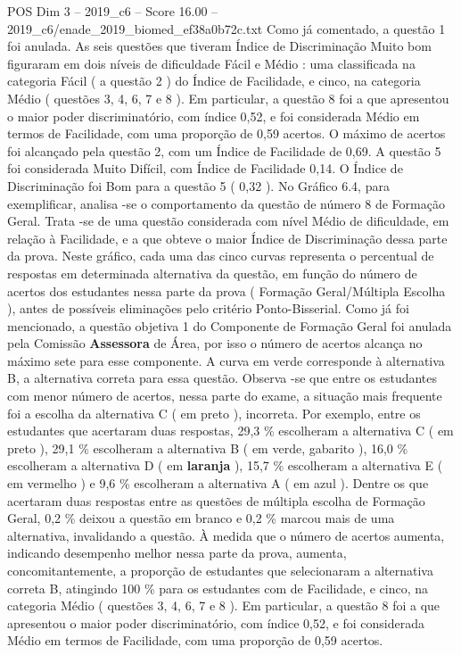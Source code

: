 \begin{textsample}{POS Dim 3 – 2019\_c6 – Score 16.00 – 2019\_c6/enade\_2019\_biomed\_ef38a0b72c.txt}
Como já comentado, a questão 1 foi anulada.
As seis questões que tiveram Índice de Discriminação Muito bom figuraram em dois níveis de dificuldade Fácil e Médio : uma classificada na categoria Fácil ( a questão 2 ) do Índice de Facilidade, e cinco, na categoria Médio ( questões 3, 4, 6, 7 e 8 ).
Em particular, a questão 8 foi a que apresentou o maior poder discriminatório, com índice 0,52, e foi considerada Médio em termos de Facilidade, com uma proporção de 0,59 acertos.
O máximo de acertos foi alcançado pela questão 2, com um Índice de Facilidade de 0,69.
A questão 5 foi considerada Muito Difícil, com Índice de Facilidade 0,14.
O Índice de Discriminação foi Bom para a questão 5 ( 0,32 ).
No Gráfico 6.4, para exemplificar, analisa -se o comportamento da questão de número 8 de Formação Geral.
Trata -se de uma questão considerada com nível Médio de dificuldade, em relação à Facilidade, e a que obteve o maior Índice de Discriminação dessa parte da prova.
Neste gráfico, cada uma das cinco curvas representa o percentual de respostas em determinada alternativa da questão, em função do número de acertos dos estudantes nessa parte da prova ( Formação Geral/Múltipla Escolha ), antes de possíveis eliminações pelo critério Ponto-Bisserial.
Como já foi mencionado, a questão objetiva 1 do Componente de Formação Geral foi anulada pela Comissão \textbf{Assessora} de Área, por isso o número de acertos alcança no máximo sete para esse componente.
A curva em verde corresponde à alternativa B, a alternativa correta para essa questão.
Observa -se que entre os estudantes com menor número de acertos, nessa parte do exame, a situação mais frequente foi a escolha da alternativa C ( em preto ), incorreta.
Por exemplo, entre os estudantes que acertaram duas respostas, 29,3 \% escolheram a alternativa C ( em preto ), 29,1 \% escolheram a alternativa B ( em verde, gabarito ), 16,0 \% escolheram a alternativa D ( em \textbf{laranja} ), 15,7 \% escolheram a alternativa E ( em vermelho ) e 9,6 \% escolheram a alternativa A ( em azul ).
Dentre os que acertaram duas respostas entre as questões de múltipla escolha de Formação Geral, 0,2 \% deixou a questão em branco e 0,2 \% marcou mais de uma alternativa, invalidando a questão.
À medida que o número de acertos aumenta, indicando desempenho melhor nessa parte da prova, aumenta, concomitantemente, a proporção de estudantes que selecionaram a alternativa correta B, atingindo 100 \% para os estudantes com de Facilidade, e cinco, na categoria Médio ( questões 3, 4, 6, 7 e 8 ).
Em particular, a questão 8 foi a que apresentou o maior poder discriminatório, com índice 0,52, e foi considerada Médio em termos de Facilidade, com uma proporção de 0,59 acertos.

\end{textsample}
